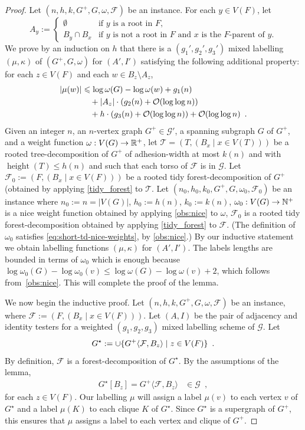 \documentclass{patmorin}
\let\eqref\cref
\renewcommand{\le}{\leqslant}
\renewcommand{\leq}{\leqslant}
\newcommand{\torso}[2]{{#1}\langle{#2}\rangle}
\DeclareMathOperator{\height}{height}
\newcommand{\Oh}{\calO}
\DeclarePairedDelimiter{\set}{\{}{\}}
\newcommand{\calF}{\mathcal{F}}
\newcommand{\calG}{\mathcal{G}}
\newcommand{\calO}{\mathcal{O}}
\newcommand{\calT}{\mathcal{T}}
\begin{document}
\begin{proof}
    Let $(n,h,k,G^+,G,\omega,\calF)$ be an instance.
    For each $y\in V(F)$, let
    \[
    A_y:=\begin{cases}
        \emptyset&\textrm{if $y$ is a root in $F$,}\\
        B_y\cap B_x&\textrm{if $y$ is not a root in $F$ and $x$ is the $F$-parent of $y$.}
    \end{cases}
    \]
    We prove by an induction on $h$ that there is a $(g_1',g_2',g_3')$ mixed labelling $(\mu,\kappa)$ of $(G^+,G,\omega)$ for $(A',I')$ satisfying the following additional property: for each $z\in V(F)$ and each $w\in B_z\setminus A_z$,
    \begin{align}
       |\mu(w)|
       & \le \log \omega(G) - \log \omega(w) + g_1(n)\notag\\
       & \quad {} + |A_z|\cdot (g_2(n) + \Oh(\log\log n))\label{strong_strong} \\
       & \quad {} + h\cdot(g_3(n) + \Oh(\log\log n)) + \Oh(\log\log n)\enspace.\notag
    \end{align}
    Given an integer $n$, an $n$-vertex graph $G^+\in\calG'$, a spanning subgraph $G$ of $G^+$, and a weight function $\omega:V(G)\to\mathbb{R}^+$, let $\calT=(T,(B_x \mid x\in V(T)))$ be a rooted tree-decomposition of $G^+$ of adhesion-width at most $k(n)$ and with $\height(T)\leq h(n)$ and such that each torso of $\calF$ is in $\calG$. Let $\calF_0:=(F,(B_x \mid x\in V(F)))$ be a rooted tidy forest-decomposition of $G^+$ (obtained by applying \cref{tidy_forest} to $\calT$.  Let $(n_0,h_0,k_0,G^+,G,\omega_0,\calF_0)$ be an instance where $n_0:=n=|V(G)|$, $h_0:=h(n)$, $k_0:=k(n)$, $\omega_0:V(G)\to\mathbb{N}^+$ is a nice weight function obtained by applying \cref{obs:nice} to $\omega$, $\calF_0$ is a rooted tidy forest-decomposition obtained by applying \cref{tidy_forest} to $\calF$.  (The definition of $\omega_0$ satisfies \eqref{eq:short-td-nice-weights}, by \cref{obs:nice}.)
    By our inductive statement we obtain labelling functions $(\mu,\kappa)$ for $(A',I')$.
    The labels lengths are bounded in terms of $\omega_0$ which is enough because $\log\omega_0(G) - \log\omega_0(v) \leq \log\omega(G)-\log\omega(v)+2$, which follows from~\cref{obs:nice}.
    This will complete the proof of the lemma.

    We now begin the inductive proof. Let $(n,h,k,G^+,G,\omega,\calF)$ be an instance, where $\calF:=(F,(B_x\mid x\in V(F)))$.
    Let $(A,I)$ be the pair of adjacency and identity testers for a weighted $(g_1,g_2,g_3)$ mixed labelling scheme of $\calG$.  Let
    \[
      G^\star:= \cup\set{\torso{G^+}{\calF,B_z}\mid z \in V(F)}\enspace.
    \]
    By definition, $\calF$ is a forest-decomposition of $G^\star$.  By the assumptions of the lemma,
    \begin{align}
      G^\star[B_z] = \torso{G^+}{\calF,B_z} &\in \calG\enspace,
      \label{eq:torso-in-the-class-G}
    \end{align}
    for each $z\in V(F)$.  Our labelling $\mu$ will assign a label $\mu(v)$ to each vertex $v$ of $G^\star$ and a label $\mu(K)$ to each clique $K$ of $G^\star$.  Since $G^\star$ is a supergraph of $G^+$, this ensures that $\mu$ assigns a label to each vertex and clique of $G^+$.


\end{proof}
\end{document}
